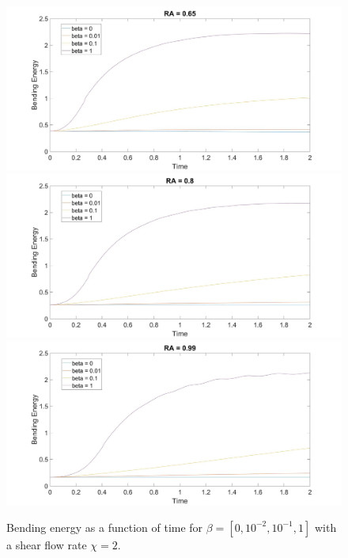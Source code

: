 \documentclass[aps,prl,showpacs]{revtex4}
\begin{document}
 \begin{figure}
 	\centering
 	\includegraphics[width=.9\textwidth]{figures/BE10.jpg}
 	\includegraphics[width=.9\textwidth]{figures/BE11.jpg}
 	\includegraphics[width=.9\textwidth]{figures/BE12.jpg}
 	\caption{Bending energy as a function of time for $\beta = [0, 10^{-2},10^{-1}, 1]$ with a shear flow rate $\chi = 2$.}
 	\label{Shear0}
 \end{figure}

 
 
\end{document}
